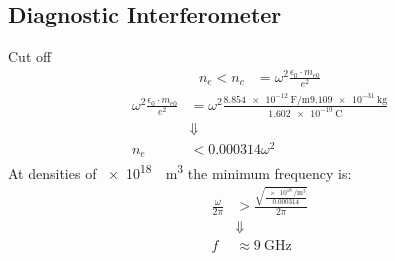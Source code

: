 \documentclass[hyperref={colorlinks=true,urlcolor=blue,linkcolor=.},aspectratio=1610,mathserif]{beamer}
\begin{document}
\subsection{Diagnostic Interferometer}

\begin{frame}{Cut off}
	\begin{align}
		n_e < n_c & = \omega^2\frac{\epsilon_0\cdot m_{e0}}{e^2}
	\end{align}
	\begin{align}
		\omega^2\frac{\epsilon_0\cdot m_{e0}}{e^2} & = \omega^2\frac{\SI{8.854e-12}{\farad\per\meter}\SI{9.109e-31}{\kilo\gram}}{\SI{1.602e-19}{\coulomb}} \\
		                                           & \Downarrow\nonumber                                                                                   \\
		n_e                                        & < 0.000314\omega^2
	\end{align}
	At densities of \SI{e18}{\per\meter\cubed} the minimum frequency is:
	\begin{align}
		\frac{\omega}{2\pi} & > \frac{\sqrt{\frac{\SI{e18}{\per\meter\cubed}}{0.000314}}}{2\pi} \\
		                    & \Downarrow\nonumber                                               \\
		f                   & \approx \SI{9}{\giga\hertz}
	\end{align}
\end{frame}
\end{document}
